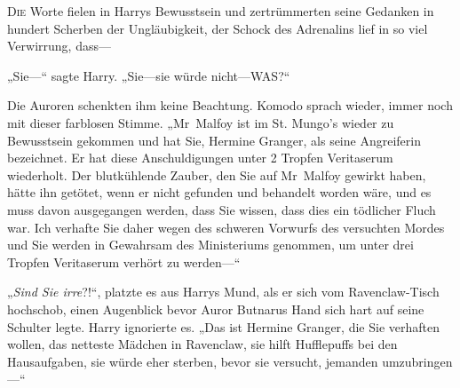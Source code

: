 
\lettrine{D}{ie} Worte fielen in Harrys Bewusstsein und zertrümmerten seine Gedanken in hundert Scherben der Ungläubigkeit, der Schock des Adrenalins lief in so viel Verwirrung, dass—

„Sie—“ sagte Harry. „Sie—sie würde nicht—WAS?“

Die Auroren schenkten ihm keine Beachtung. Komodo sprach wieder, immer noch mit dieser farblosen Stimme. „Mr~Malfoy ist im St. Mungo’s wieder zu Bewusstsein gekommen und hat Sie, Hermine Granger, als seine Angreiferin bezeichnet. Er hat diese Anschuldigungen unter 2 Tropfen Veritaserum wiederholt. Der blutkühlende Zauber, den Sie auf Mr~Malfoy gewirkt haben, hätte ihn getötet, wenn er nicht gefunden und behandelt worden wäre, und es muss davon ausgegangen werden, dass Sie wissen, dass dies ein tödlicher Fluch war. Ich verhafte Sie daher wegen des schweren Vorwurfs des versuchten Mordes und Sie werden in Gewahrsam des Ministeriums genommen, um unter drei Tropfen Veritaserum verhört zu werden—“

„\emph{Sind Sie irre}?!“, platzte es aus Harrys Mund, als er sich vom Ravenclaw-Tisch hochschob, einen Augenblick bevor Auror Butnarus Hand sich hart auf seine Schulter legte. Harry ignorierte es. „Das ist Hermine Granger, die Sie verhaften wollen, das netteste Mädchen in Ravenclaw, sie hilft Hufflepuffs bei den Hausaufgaben, sie würde eher sterben, bevor sie versucht, jemanden umzubringen—“

